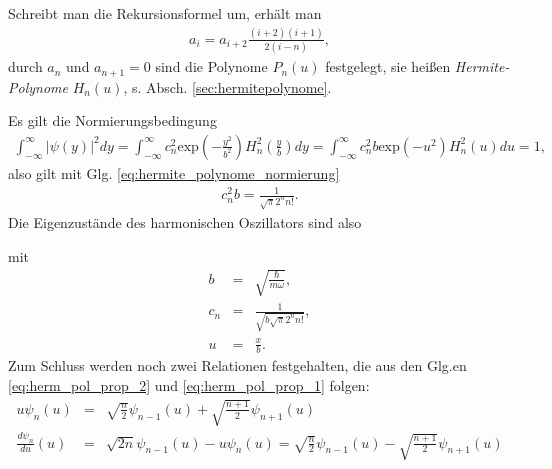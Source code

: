 \documentclass{book}
\renewcommand{\exp}{\text{exp}}
\begin{document}
Schreibt man die Rekursionsformel um, erhält man
%
\begin{eqnarray}
a_{i} = a_{i + 2} \frac{\left(i + 2\right)\left(i + 1\right)}{2\left(i - n\right)}, \label{eq:hermite_poly_rek}
\end{eqnarray}
%
durch $a_{n}$ und $a_{n + 1} = 0$ sind die Polynome $P_n\left(u\right)$ festgelegt, sie heißen \textit{Hermite-Polynome} $H_n\left(u\right)$, s. Absch. \ref{sec:hermitepolynome}.

Es gilt die Normierungsbedingung
%
\begin{eqnarray}
\int_{ - \infty}^{\infty}\left|\psi\left(y\right)\right|^2dy = \int_{ - \infty}^{\infty}c_n^2\exp\left(-\frac{y^2}{b^2}\right)H_n^2\left(\frac{y}{b}\right)dy = \int_{ - \infty}^{\infty}c_n^2b\exp\left(-u^2\right)H_n^2\left(u\right)du = 1, 
\end{eqnarray}
%
also gilt mit Glg. \eqref{eq:hermite_polynome_normierung}
%
\begin{eqnarray}
c_n^2b = \frac{1}{\sqrt{\pi}2^nn!}.
\end{eqnarray}
%
Die Eigenzustände des harmonischen Oszillators sind also
%
\begin{center}
\doublebox{\parbox{0.8\textwidth}{
\begin{center}
\begin{eqnarray}
\psi_n\left(u\right) = c_nH_n\left(u\right)\exp\left(-\frac{u^2}{2}\right)
\end{eqnarray}
\end{center}
}}
\end{center}
%
mit
%
\begin{eqnarray}
b & = & \sqrt{\frac{\hbar}{m\omega}},\\
c_n & = & \frac{1}{\sqrt{b\sqrt{\pi}2^nn!}},\\
u & = & \frac{x}{b}.
\end{eqnarray}
%
Zum Schluss werden noch zwei Relationen festgehalten, die aus den Glg.en \eqref{eq:herm_pol_prop_2} und \eqref{eq:herm_pol_prop_1} folgen:
%
\begin{eqnarray}
u\psi_n\left(u\right) & = & \sqrt{\frac{n}{2}}\psi_{n - 1}\left(u\right) + \sqrt{\frac{n + 1}{2}}\psi_{n + 1}\left(u\right)\label{eq:harm_osz_zust_prop_1}\\
\frac{d\psi_n}{du}\left(u\right) & = & \sqrt{2n}\psi_{n - 1}\left(u\right) - u\psi_n\left(u\right) = \sqrt{\frac{n}{2}}\psi_{n - 1}\left(u\right) - \sqrt{\frac{n + 1}{2}}\psi_{n + 1}\left(u\right)\label{eq:harm_osz_zust_prop_2}
\end{eqnarray}
%
\end{document}
